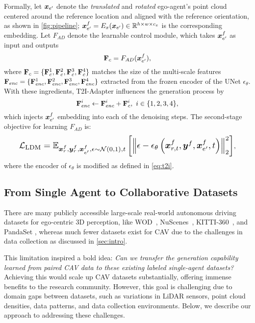 Formally, let ${\bm{x}}_{e'}$ denote 
the \emph{translated} and \emph{rotated} ego-agent's point cloud centered around the reference location and aligned with the reference orientation, as shown in \cref{fig:pipeline}; ${\bm{x}}_{e'}^f=E_x({\bm{x}}_{e'}) \in {\mathbb{R}}^{h \times w \times c_x}$ is the corresponding embedding. 
Let $F_{AD}$ denote the learnable control module, which takes ${\bm{x}}_{e'}^f$ as input and outputs 
\begin{equation}
    {\mathbf{F}}_c = F_{AD}({\bm{x}}_{e'}^f),\label{eq:T2I-adapter}
\end{equation}
where ${\mathbf{F}}_{c}=\{{\mathbf{F}}_c^1, {\mathbf{F}}_c^2, {\mathbf{F}}_c^3, {\mathbf{F}}_c^4\}$ matches the size of the  
multi-scale features ${\mathbf{F}}_{enc}=\{{\mathbf{F}}_{enc}^1, {\mathbf{F}}_{enc}^2, {\mathbf{F}}_{enc}^3, {\mathbf{F}}_{enc}^4\}$ extracted from the frozen encoder of the UNet 
$\epsilon_\theta$. With these ingredients, T2I-Adapter influences the generation process by 
\begin{equation}
    {{\mathbf{F}}}_{enc}^{i} \leftarrow {\mathbf{F}}_{enc}^{i} + {\mathbf{F}}_{c}^{i},\ i\in \{1,2,3,4\},
\label{eq:t2i}
\end{equation}
which injects ${\bm{x}}_{e'}^f$ embedding into each of the denoising steps. The second-stage objective for learning $F_{AD}$ is:
\begin{equation}
    \resizebox{0.91\hsize}{!}{$\Ls_{\text{LDM}} = \sE_{\vx_r^f, \vy_r^f, \vx_{e'}^f, \epsilon \sim \gN(0,1), t}\left[\left\|\epsilon-\epsilon_\theta\left(\vx^f_{r, t}, \vy^f, \vx_{e'}^f, t\right)\right\|_2^2\right]$},
\label{eq:ldm2}
\end{equation}
where the encoder of $\epsilon_\theta$ is modified as defined in \cref{eq:t2i}.

 


\subsection{From Single Agent to Collaborative Datasets}
\label{sec:adapt}
There are many publicly accessible large-scale real-world autonomous driving datasets for ego-centric 3D perception, like WOD~\citep{sun2020waymo}, NuScenes~\citep{caesar2020nuscenes}, KITTI-360~\citep{liao2022kitti360}, and PandaSet \citep{xiao2021pandaset}, whereas much fewer datasets exist for CAV due to the challenges in data collection as discussed in \cref{sec:intro}.

This limitation inspired a bold idea: \emph{Can we transfer the generation capability learned from paired CAV data to these existing labeled single-agent datasets?} Achieving this would scale up CAV datasets substantially, offering immense benefits to the research community. However, this goal is challenging due to domain gaps between datasets, such as variations in LiDAR sensors, point cloud densities, data patterns, and data collection environments. Below, we describe our approach to addressing these challenges.

